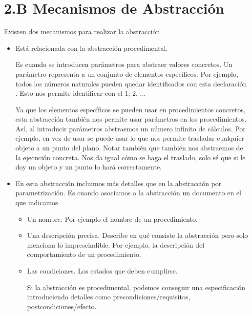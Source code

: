 \section*{2.B Mecanismos de Abstracción}

Existen dos mecanismos para realizar la abstracción
\begin{itemize}
\item {} Está relacionada con la abstracción procedimental.

Es cuando se introducen parámetros para abstraer valores concretos. Un parámetro representa a un conjunto de elementos específicos. Por ejemplo, todos los números naturales pueden quedar identificados con esta declaración . Esto nos permite identificar  con el 1, 2, ...

Ya que los elementos específicos se pueden usar en procedimientos concretos, esta abstracción también nos permite usar parámetros en los procedimientos. Así, al introducir parámetros abstraemos un número infinito de cálculos. Por ejemplo, en vez de usar  se puede usar   lo que nos permite trasladar cualquier objeto a un punto del plano.  
Notar también que también nos abstraemos de la ejecución concreta. Nos da igual cómo se haga el traslado, solo sé que si le doy un objeto y un punto lo hará correctamente.


\item {} 
En esta abstracción incluimos más detalles que en la abstracción por parametrización.
Es cuando asociamos a la abstracción un documento en el que indicamos
\begin{itemize}
\item Un nombre. Por ejemplo el nombre de un procedimiento.
\item Una descripción precisa. Describe en qué consiste la abstracción pero solo menciona lo imprescindible. Por ejemplo, la descripción del comportamiento de un procedimiento.
\item Las condiciones. Los estados que deben cumplirse.

Si la abstracción es procedimental, podemos conseguir una especificación introduciendo detalles como precondiciones/requisitos, postcondiciones/efecto.


\end{itemize}
\end{itemize}
